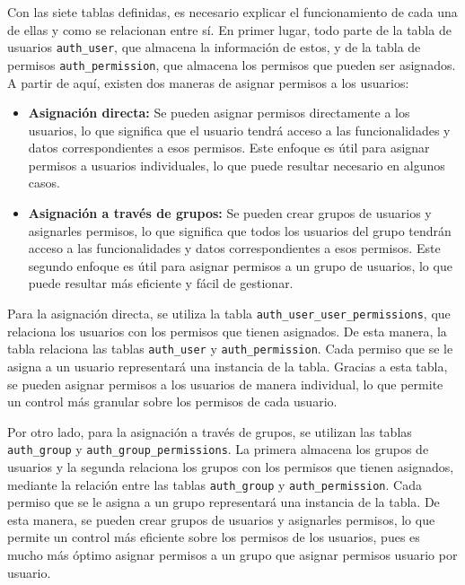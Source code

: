 Con las siete tablas definidas, es necesario explicar el funcionamiento de cada una de ellas y como se relacionan entre sí. En primer lugar, todo parte de la tabla de usuarios \texttt{auth\_user}, que almacena la información de estos, y de la tabla de permisos \texttt{auth\_permission}, que almacena los permisos que pueden ser asignados. A partir de aquí, existen dos maneras de asignar permisos a los usuarios:

\begin{itemize}
    \item \textbf{Asignación directa:} Se pueden asignar permisos directamente a los usuarios, lo que significa que el usuario tendrá acceso a las funcionalidades y datos correspondientes a esos permisos. Este enfoque es útil para asignar permisos a usuarios individuales, lo que puede resultar necesario en algunos casos.
    \item \textbf{Asignación a través de grupos:} Se pueden crear grupos de usuarios y asignarles permisos, lo que significa que todos los usuarios del grupo tendrán acceso a las funcionalidades y datos correspondientes a esos permisos. Este segundo enfoque es útil para asignar permisos a un grupo de usuarios, lo que puede resultar más eficiente y fácil de gestionar.
\end{itemize}

Para la asignación directa, se utiliza la tabla \texttt{auth\_user\_user\_permissions}, que relaciona los usuarios con los permisos que tienen asignados. De esta manera, la tabla relaciona las tablas \texttt{auth\_user} y \texttt{auth\_permission}. Cada permiso que se le asigna a un usuario representará una instancia de la tabla. Gracias a esta tabla, se pueden asignar permisos a los usuarios de manera individual, lo que permite un control más granular sobre los permisos de cada usuario.

Por otro lado, para la asignación a través de grupos, se utilizan las tablas \texttt{auth\_group} y \texttt{auth\_group\_permissions}. La primera almacena los grupos de usuarios y la segunda relaciona los grupos con los permisos que tienen asignados, mediante la relación entre las tablas \texttt{auth\_group} y \texttt{auth\_permission}. Cada permiso que se le asigna a un grupo representará una instancia de la tabla. De esta manera, se pueden crear grupos de usuarios y asignarles permisos, lo que permite un control más eficiente sobre los permisos de los usuarios, pues es mucho más óptimo asignar permisos a un grupo que asignar permisos usuario por usuario.


